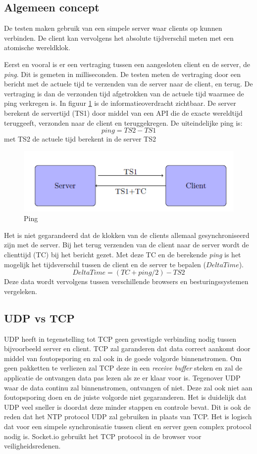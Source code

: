 \subsection{Algemeen concept}
De testen maken gebruik van een simpele server waar clients op kunnen verbinden. De client kan vervolgens het absolute tijdverschil meten met een atomische wereldklok.

Eerst en vooral is er een vertraging tussen een aangesloten client en de server, de {\it ping}. Dit is gemeten in milliseconden. De testen meten de vertraging door een bericht met de actuele tijd te verzenden van de server naar de client, en terug. De vertraging is dan de verzonden tijd afgetrokken van de actuele tijd waarmee de ping verkregen is.
In figuur \ref{ping} is de informatieoverdracht zichtbaar. De server berekent de servertijd (TS1) door middel van een API die de exacte wereldtijd teruggeeft, verzonden naar de client en teruggekregen. De uiteindelijke ping is: \[ping = TS2 - TS1\] met TS2 de actuele tijd berekent in de server TS2

\begin{figure}[h]
\centering
\includegraphics[scale=0.8]{img/img.png}
\caption{Ping} \label{ping}
\end{figure}


Het is niet gegarandeerd dat de klokken van de clients allemaal gesynchroniseerd zijn met de server. Bij het terug verzenden van de client naar de server wordt de clienttijd (TC) bij het bericht gezet.  Met deze TC en de berekende {\it ping} is het mogelijk het tijdsverschil tussen de client en de server te bepalen ($DeltaTime$).
\[DeltaTime = (TC+ping/2) - TS2\]
Deze data wordt vervolgens tussen verschillende browsers en besturingssystemen vergeleken.

\subsection{UDP vs TCP}

UDP heeft in tegenstelling tot TCP geen gevestigde verbinding nodig tussen bijvoorbeeld server en client. TCP zal garanderen dat data correct aankomt door middel van foutopsporing en zal ook in de goede volgorde binnenstromen. Om geen pakketten te verliezen zal TCP deze in een {\it receive buffer} steken en zal de applicatie de ontvangen data pas lezen als ze er klaar voor is. Tegenover UDP waar de data continu zal binnenstromen, ontvangen of niet. Deze zal ook niet aan foutopsporing doen en de juiste volgorde niet gegaranderen. Het is duidelijk dat UDP veel sneller is doordat deze minder stappen en controle bevat. Dit is ook de reden dat het NTP protocol UDP zal gebruiken in plaats van TCP. Het is logisch dat voor een simpele synchronisatie tussen client en server geen complex protocol nodig is. Socket.io gebruikt het TCP protocol in de browser voor veiligheidsredenen.

